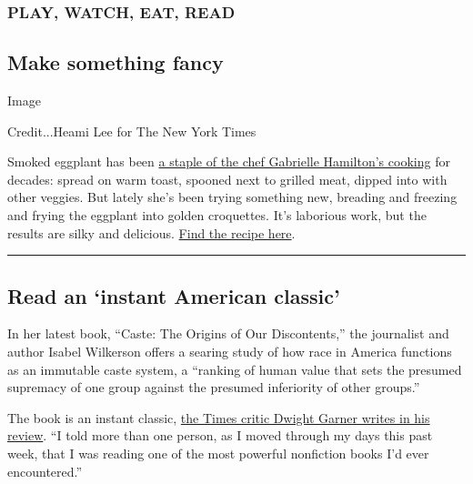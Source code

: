 \hypertarget{play-watch-eat-read}{%
\subsubsection{\texorpdfstring{\textbf{PLAY, WATCH, EAT,
READ}}{PLAY, WATCH, EAT, READ}}\label{play-watch-eat-read}}

\hypertarget{make-something-fancy}{%
\subsection{Make something fancy}\label{make-something-fancy}}

Image

Credit...Heami Lee for The New York Times

Smoked eggplant has been
\href{https://www.nytimes3xbfgragh.onion/2020/07/29/magazine/bored-with-your-home-cooking-some-smoky-eggplant-will-fix-that.html}{a
staple of the chef Gabrielle Hamilton's cooking} for decades: spread on
warm toast, spooned next to grilled meat, dipped into with other
veggies. But lately she's been trying something new, breading and
freezing and frying the eggplant into golden croquettes. It's laborious
work, but the results are silky and delicious.
\href{https://cooking.nytimes3xbfgragh.onion/recipes/1021285-smoky-eggplant-croquettes?action=click\&module=Global\%20Search\%20Recipe\%20Card\&pgType=search\&rank=2}{Find
the recipe here}.

\begin{center}\rule{0.5\linewidth}{\linethickness}\end{center}

\hypertarget{read-an-instant-american-classic}{%
\subsection{Read an `instant American
classic'}\label{read-an-instant-american-classic}}

In her latest book, ``Caste: The Origins of Our Discontents,'' the
journalist and author Isabel Wilkerson offers a searing study of how
race in America functions as an immutable caste system, a ``ranking of
human value that sets the presumed supremacy of one group against the
presumed inferiority of other groups.''

The book is an instant classic,
\href{https://www.nytimes3xbfgragh.onion/2020/07/31/books/review-caste-isabel-wilkerson-origins-of-our-discontents.html}{the
Times critic Dwight Garner writes in his review}. ``I told more than one
person, as I moved through my days this past week, that I was reading
one of the most powerful nonfiction books I'd ever encountered.''


